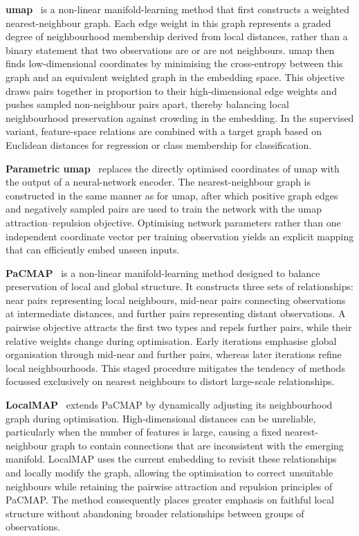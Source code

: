     \noindent \textbf{\Gls{umap}}~\citep{McIEtAl18} is a non-linear manifold-learning method that first constructs a weighted nearest-neighbour graph. Each edge weight in this graph represents a graded degree of neighbourhood membership derived from local distances, rather than a binary statement that two observations are or are not neighbours. \gls{umap} then finds low-dimensional coordinates by minimising the cross-entropy between this graph and an equivalent weighted graph in the embedding space. This objective draws pairs together in proportion to their high-dimensional edge weights and pushes sampled non-neighbour pairs apart, thereby balancing local neighbourhood preservation against crowding in the embedding.
    In the supervised variant, feature-space relations are combined with a target graph based on Euclidean distances for regression or class membership for classification.

    \noindent \textbf{Parametric \gls{umap}}~\citep{SaiEtAl21} replaces the directly optimised coordinates of \gls{umap} with the output of a neural-network encoder. The nearest-neighbour graph is constructed in the same manner as for \gls{umap}, after which positive graph edges and negatively sampled pairs are used to train the network with the \gls{umap} attraction--repulsion objective. Optimising network parameters rather than one independent coordinate vector per training observation yields an explicit mapping that can efficiently embed unseen inputs.

    \noindent \textbf{PaCMAP}~\citep{WanEtAl21} is a non-linear manifold-learning method designed to balance preservation of local and global structure. It constructs three sets of relationships: near pairs representing local neighbours, mid-near pairs connecting observations at intermediate distances, and further pairs representing distant observations. A pairwise objective attracts the first two types and repels further pairs, while their relative weights change during optimisation. Early iterations emphasise global organisation through mid-near and further pairs, whereas later iterations refine local neighbourhoods. This staged procedure mitigates the tendency of methods focussed exclusively on nearest neighbours to distort large-scale relationships.

    \noindent \textbf{LocalMAP}~\citep{WanEtAl25} extends PaCMAP by dynamically adjusting its neighbourhood graph during optimisation. High-dimensional distances can be unreliable, particularly when the number of features is large, causing a fixed nearest-neighbour graph to contain connections that are inconsistent with the emerging manifold. LocalMAP uses the current embedding to revisit these relationships and locally modify the graph, allowing the optimisation to correct unsuitable neighbours while retaining the pairwise attraction and repulsion principles of PaCMAP. The method consequently places greater emphasis on faithful local structure without abandoning broader relationships between groups of observations.


